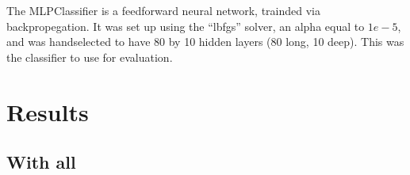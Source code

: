 \documentclass{UoNMCHA}
\newcommand{\inlineQuote}[1]{``#1''}
\numberwithin{equation}{section}
\begin{document}
The MLPClassifier is a feedforward neural network, trainded via backpropegation. It was set up using the \inlineQuote{lbfgs} solver, an alpha equal to $1e-5$, and was handselected to have 80 by 10 hidden layers (80 long, 10 deep). This was the classifier to use for evaluation.



\section{Results}

\subsection{With all}
\end{document}
